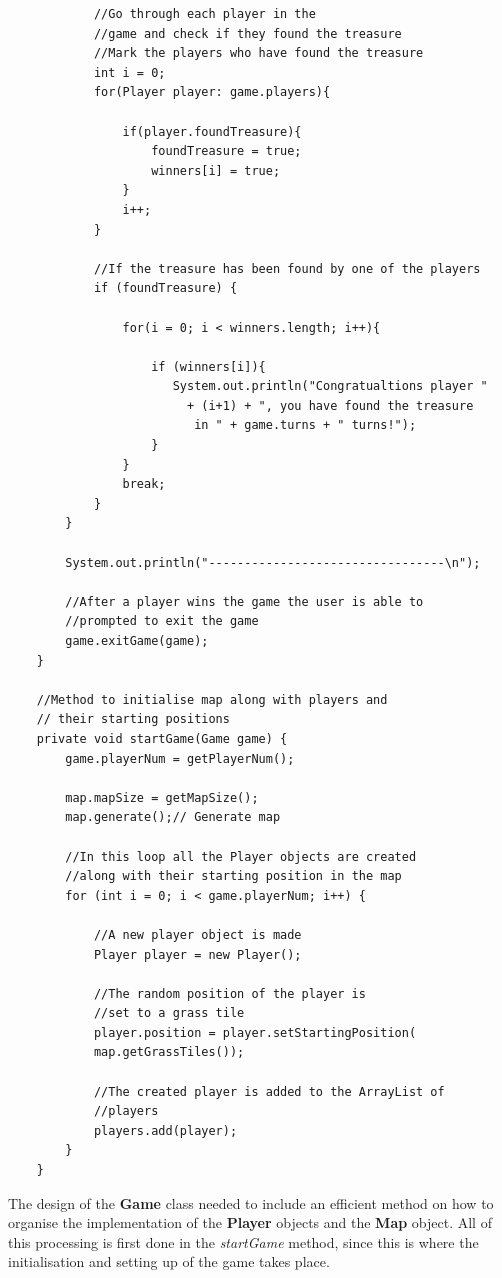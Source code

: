 \documentclass[a4paper,12pt]{extarticle}
\begin{document}
\begin{lstlisting}
            //Go through each player in the 
            //game and check if they found the treasure
            //Mark the players who have found the treasure
            int i = 0;
            for(Player player: game.players){

                if(player.foundTreasure){
                    foundTreasure = true;
                    winners[i] = true;
                }
                i++;
            }

            //If the treasure has been found by one of the players
            if (foundTreasure) {

                for(i = 0; i < winners.length; i++){

                    if (winners[i]){
                       System.out.println("Congratualtions player "
                         + (i+1) + ", you have found the treasure
                          in " + game.turns + " turns!");
                    }
                }
                break;
            }
        }

        System.out.println("---------------------------------\n");

        //After a player wins the game the user is able to
        //prompted to exit the game
        game.exitGame(game);
    }

    //Method to initialise map along with players and
    // their starting positions
    private void startGame(Game game) {
        game.playerNum = getPlayerNum();

        map.mapSize = getMapSize();
        map.generate();// Generate map

        //In this loop all the Player objects are created 
        //along with their starting position in the map
        for (int i = 0; i < game.playerNum; i++) {

            //A new player object is made
            Player player = new Player();

            //The random position of the player is 
            //set to a grass tile
            player.position = player.setStartingPosition(
            map.getGrassTiles());

            //The created player is added to the ArrayList of 
            //players
            players.add(player);
        }
    }

\end{lstlisting}
\vspace{4mm}

\noindent The design of the \textbf{Game} class needed to include an efficient method on how to organise the implementation of the \textbf{Player} objects and the \textbf{Map} object. All of this processing is first done in the \textit{startGame} method, since this is where the initialisation and setting up of the game takes place.\\
\end{document}
